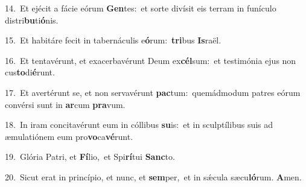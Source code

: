 {\numbfont\textcolor{\numbcolor}{14.}}~Et ejécit a fácie eórum \textbf{Gen}\-tes:~\star et sorte divísit eis terram in funículo distri\-\textbf{bu}\-ti\-\textbf{ó}\-nis.\par
{\numbfont\textcolor{\numbcolor}{15.}}~Et habitáre fecit in tabernáculis e\-\textbf{ó}\-rum:~\star \textbf{tri}\-bus \textbf{Is}\-raël.\par
{\numbfont\textcolor{\numbcolor}{16.}}~Et tentavérunt, et exacerbavérunt Deum ex\-\textbf{cél}\-sum:~\star et testimónia ejus non cus\-\textbf{to}\-di\-\textbf{é}\-runt.\par
{\numbfont\textcolor{\numbcolor}{17.}}~Et avertérunt se, et non servavérunt \textbf{pac}\-tum:~\star quemádmodum patres eórum convérsi sunt in \textbf{ar}\-cum \textbf{pra}\-vum.\par
{\numbfont\textcolor{\numbcolor}{18.}}~In iram concitavérunt eum in cóllibus \textbf{su}\-is:~\star et in sculptílibus suis ad æmulatiónem eum pro\-\textbf{vo}\-ca\-\textbf{vé}\-runt.\par
{\numbfont\textcolor{\numbcolor}{19.}}~Glória Patri, et \textbf{Fí}\-lio,~\star et Spi\-\textbf{rí}\-tui \textbf{Sanc}\-to.\par
{\numbfont\textcolor{\numbcolor}{20.}}~Sicut erat in princípio, et nunc, et \textbf{sem}\-per,~\star et in sǽcula sæcu\-\textbf{ló}\-rum. \textbf{A}\-men.\par

